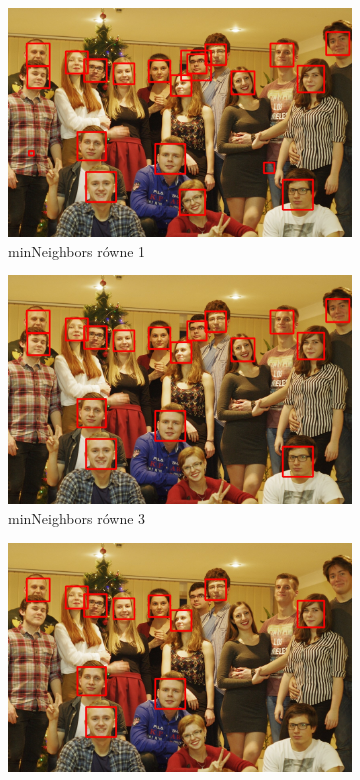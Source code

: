 \documentclass{article}
\numberwithin{equation}{section}
\begin{document}
\begin{figure}[H]
    \centering
        \begin{subfigure}{0.32\textwidth}
        \centering
        \includegraphics[width=\linewidth]{somsiad1.jpg}
        \caption{minNeighbors równe 1}
        \label{fig:somsiadTwarze1}
    \end{subfigure}\hfill
    \begin{subfigure}{0.32\textwidth}
        \centering
        \includegraphics[width=\linewidth]{somsiad3.jpg}
        \caption{minNeighbors równe 3}
        \label{fig:somsiadTwarze3}
    \end{subfigure}\hfill
    \begin{subfigure}{0.32\textwidth}
        \centering
        \includegraphics[width=\linewidth]{somsiad8.jpg}

\end{subfigure}
\end{figure}
\end{document}
